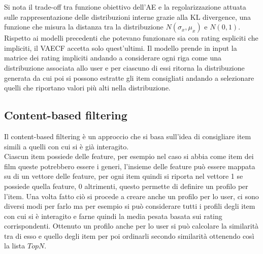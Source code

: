 Si nota il trade-off tra funzione obiettivo dell'AE e la regolarizzazione attuata sulle rappresentazione delle distribuzioni interne grazie alla KL divergence, una funzione che misura la distanza tra la distribuzione $N(\sigma_x, \mu_x)$ e $N(0,1)$.\\
Rispetto ai modelli precedenti che potevano funzionare sia con rating espliciti che impliciti, il VAECF accetta solo quest'ultimi. Il modello prende in input la matrice dei rating impliciti andando a considerare ogni riga come una distribuzione associata allo user e per ciascuno di essi ritorna la distribuzione generata da cui poi si possono estratte gli item consigliati andando a selezionare quelli che riportano valori più alti nella distribuzione.

\subsection{Content-based filtering}
Il content-based filtering è un approccio che si basa sull'idea di consigliare item simili a quelli con cui si è già interagito.\\
Ciascun item possiede delle feature, per esempio nel caso si abbia come item dei film queste potrebbero essere i generi, l'insieme delle feature può essere mappata su di un vettore delle feature, per ogni item quindi si riporta nel vettore 1 se possiede quella feature, 0 altrimenti, questo permette di definire un profilo per l'item.
Una volta fatto ciò si procede a creare anche un profilo per lo user, ci sono diversi modi per farlo ma per esempio si può considerare tutti i profili degli item con cui si è interagito e farne quindi la media pesata basata sui rating corrispondenti.
Ottenuto un profilo anche per lo user si può calcolare la similarità tra di esso e quello degli item per poi ordinarli secondo similarità ottenendo così la lista $TopN$.

